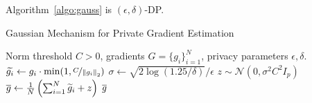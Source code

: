 \begin{theo}
\label{theo:gauss}
Algorithm~\ref{algo:gauss} is $(\epsilon, \delta)$-DP.
\end{theo}

\begin{algorithm}[H]
\centering
\caption{Gaussian Mechanism for Private Gradient Estimation}
\begin{algorithmic}[1]
  Norm threshold $C > 0$, gradients $G = \{g_i\}_{i=1}^N$, privacy parameters $\epsilon, \delta$.
      \State $\widetilde{g_i} \gets g_i \cdot \min(1, \nicefrac{C}{ \left\lVert g_i\right\rVert_2 })$ 
  \EndFor
  \State $\sigma \gets  \sqrt{2 \log(1.25 / \delta) } / \epsilon $
  \State $z \sim \mathcal{N}(0, \sigma^2 C^2 I_p)$
  \State $\mathop{\overline{g}} \gets \frac{1}{N}\left(\sum_{i=1}^N \widetilde{g}_i + z\right)$
  \State \Return $\mathop{\overline{g}}$
\end{algorithmic}
\label{algo:gauss_grad}
\end{algorithm}

